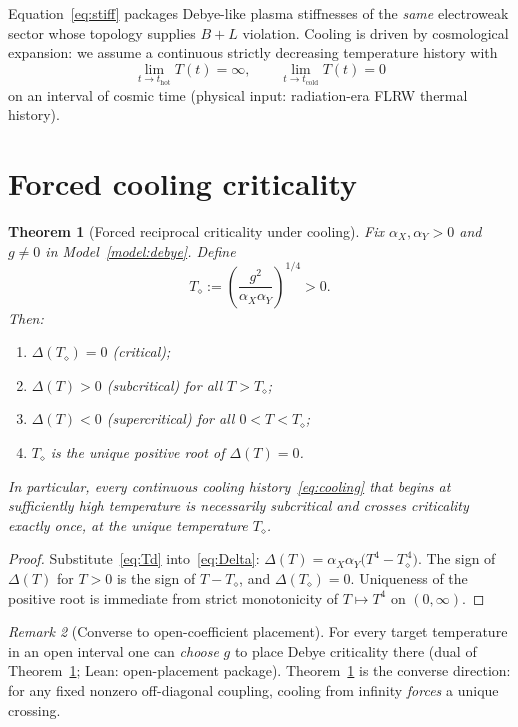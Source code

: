 \documentclass[11pt]{article}
\newtheorem{theorem}{Theorem}[section]
\theoremstyle{definition}
\theoremstyle{remark}
\newtheorem{remark}[theorem]{Remark}
\newcommand{\Td}{T_{\diamond}}
\begin{document}
Equation~\eqref{eq:stiff} packages Debye-like plasma stiffnesses of the
\emph{same} electroweak sector whose topology supplies $B{+}L$ violation.
Cooling is driven by cosmological expansion: we assume a continuous strictly
decreasing temperature history with
\begin{equation}
\label{eq:cooling}
\lim_{t\to t_{\mathrm{hot}}}T(t)=\infty,
\qquad
\lim_{t\to t_{\mathrm{cold}}}T(t)=0
\end{equation}
on an interval of cosmic time (physical input: radiation-era FLRW thermal history).

\section{Forced cooling criticality}
\label{sec:cooling}
\begin{theorem}[Forced reciprocal criticality under cooling]
\label{thm:cooling}
Fix $\alpha_X,\alpha_Y>0$ and $g\neq0$ in Model~\ref{model:debye}.
Define
\begin{equation}
\label{eq:Td}
\boxed{\Td:=\left(\frac{g^2}{\alpha_X\alpha_Y}\right)^{1/4}>0.}
\end{equation}
Then:
\begin{enumerate}[label=(\roman*)]
\item $\Delta(\Td)=0$ (critical);
\item $\Delta(T)>0$ (subcritical) for all $T>\Td$;
\item $\Delta(T)<0$ (supercritical) for all $0<T<\Td$;
\item $\Td$ is the unique positive root of $\Delta(T)=0$.
\end{enumerate}
In particular, every continuous cooling history~\eqref{eq:cooling} that begins at
sufficiently high temperature is necessarily subcritical and crosses criticality
exactly once, at the unique temperature $\Td$.
\end{theorem}

\begin{proof}
Substitute~\eqref{eq:Td} into~\eqref{eq:Delta}:
$\Delta(T)=\alpha_X\alpha_Y\bigl(T^4-\Td^{\,4}\bigr)$.
The sign of $\Delta(T)$ for $T>0$ is the sign of $T-\Td$, and $\Delta(\Td)=0$.
Uniqueness of the positive root is immediate from strict monotonicity of
$T\mapsto T^4$ on $(0,\infty)$.
\end{proof}

\begin{remark}[Converse to open-coefficient placement]
\label{rem:converse}
For every target temperature in an open interval one can
\emph{choose} $g$ to place Debye criticality there (dual of Theorem~\ref{thm:cooling};
Lean: open-placement package).
Theorem~\ref{thm:cooling} is the converse direction: for any fixed nonzero
off-diagonal coupling, cooling from infinity \emph{forces} a unique crossing.
\end{remark}
\end{document}
